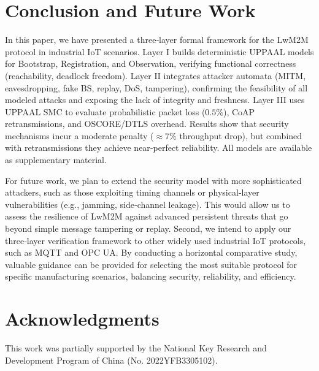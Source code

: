\documentclass[a4paper,fleqn]{cas-sc}
\begin{document}
\section{Conclusion and Future Work}
In this paper, we have presented a three‑layer formal framework for the LwM2M protocol in industrial IoT scenarios. Layer I builds deterministic UPPAAL models for Bootstrap, Registration, and Observation, verifying functional correctness (reachability, deadlock freedom). Layer II integrates attacker automata (MITM, eavesdropping, fake BS, replay, DoS, tampering), confirming the feasibility of all modeled attacks and exposing the lack of integrity and freshness. Layer III uses UPPAAL SMC to evaluate probabilistic packet loss ($0.5\%$), CoAP retransmissions, and OSCORE/DTLS overhead. Results show that security mechanisms incur a moderate penalty ($\approx7\%$ throughput drop), but combined with retransmissions they achieve near‑perfect reliability. All models are available as supplementary material.

For future work, we plan to extend the security model with more sophisticated attackers, such as those exploiting timing channels or physical‑layer vulnerabilities (e.g., jamming, side‑channel leakage). This would allow us to assess the resilience of LwM2M against advanced persistent threats that go beyond simple message tampering or replay. Second, we intend to apply our three‑layer verification framework to other widely used industrial IoT protocols, such as MQTT and OPC UA. By conducting a horizontal comparative study, valuable guidance can be provided for selecting the most suitable protocol for specific manufacturing scenarios, balancing security, reliability, and efficiency.



\section*{Acknowledgments}
This work was partially supported by the National Key Research and Development Program of China (No. 2022YFB3305102).

\printcredits


% 


\end{document}
